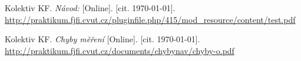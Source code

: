 
\begin{thebibliography}{9}
 Kolektiv KF. \emph{Návod:} [Online]. [cit. \today]. \newline \url{http://praktikum.fjfi.cvut.cz/pluginfile.php/415/mod\_resource/content/test.pdf}

 Kolektiv KF. \emph{Chyby měření} [Online]. [cit. \today]. \newline \url{http://praktikum.fjfi.cvut.cz/documents/chybynav/chyby-o.pdf}

\end{thebibliography}
